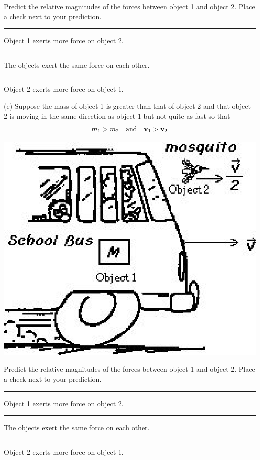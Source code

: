 Predict the relative magnitudes of the forces between object 1 and object 2.
Place a check next to your prediction. 

\rule{0.5in}{0.1pt} Object 1 exerts more force on object 2. 

\rule{0.5in}{0.1pt} The objects exert the same force on each other.

\rule{0.5in}{0.1pt} Object 2 exerts more force on object 1.

(e) Suppose the mass of object 1 is greater than that of object 2 and that object
2 is moving in the same direction as object 1 but not quite as fast so that
\[
m_{1}>m_{2}\quad \mbox{and}\quad {{\bf v}_{1}}>{{\bf v}_{2}}\]


\vspace{0.3cm}
{\par\centering \includegraphics{momentum/newtons_laws_fig5.eps} \par}
\vspace{0.3cm}

Predict the relative magnitudes of the forces between object 1 and object 2.
Place a check next to your prediction. 

\rule{0.5in}{0.1pt} Object 1 exerts more force on object 2. 

\rule{0.5in}{0.1pt} The objects exert the same force on each other. 

\rule{0.5in}{0.1pt} Object 2 exerts more force on object 1.

\newpage

